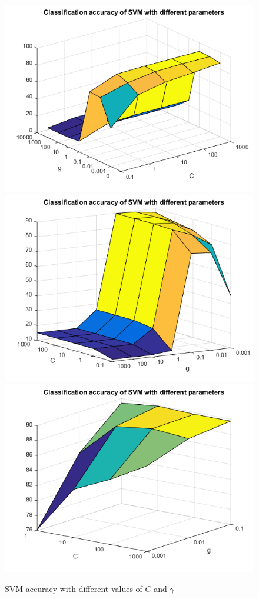 \documentclass{article} %
\begin{document}
\begin{figure}[h]
\begin{center}
\includegraphics[scale=0.3]{svmview1.png}
\includegraphics[scale=0.3]{svmview2.png}
\includegraphics[scale=0.3]{svmview3.png}
\end{center}
\caption{SVM accuracy with different values of $C$ and $\gamma$}
\label{fig:svm-acc-c-gamma}
\end{figure}
\end{document}
